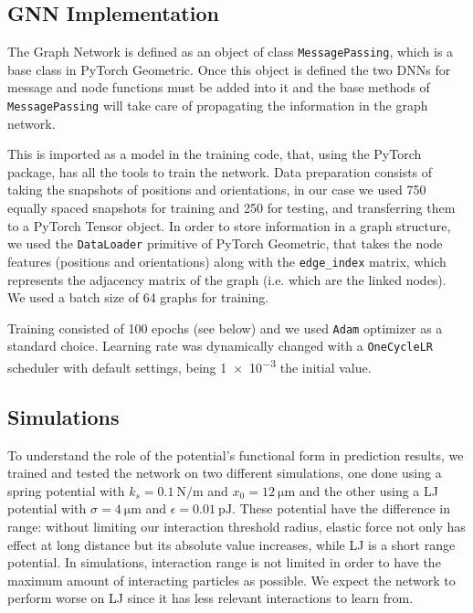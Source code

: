\documentclass[../../master_thesis_np.tex]{subfiles}
\begin{document}
\subsection{GNN Implementation}
The Graph Network is defined as an object of class \verb|MessagePassing|, which is a base class in PyTorch Geometric.
Once this object is defined the two DNNs for message and node functions must be added into it and the base methods of \verb|MessagePassing| will take care of propagating the information in the graph network.

This is imported as a model in the training code, that, using the PyTorch package, has all the tools to train the network.
Data preparation consists of taking the snapshots of positions and orientations, in our case we used 750 equally spaced snapshots for training and 250 for testing, and transferring them to a PyTorch Tensor object.
In order to store information in a graph structure, we used the \verb|DataLoader| primitive of PyTorch Geometric, that takes the node features (positions and orientations) along with the \verb|edge_index| matrix, which represents the adjacency matrix of the graph (i.e. which are the linked nodes).
We used a batch size of 64 graphs for training.

Training consisted of 100 epochs (see below) and we used \verb|Adam| optimizer as a standard choice.
Learning rate was dynamically changed with a \verb|OneCycleLR| scheduler with default settings, being \num{1e-3} the initial value.

\subsection{Simulations}
To understand the role of the potential's functional form in prediction results, we trained and tested the network on two different simulations, one done using a spring potential with $k_s = \SI{0.1}{\newton\per\meter}$ and $x_0 = \SI{12}{\um}$ and the other using a LJ potential with $\sigma = \SI{4}{\um}$ and $\epsilon = \SI{0.01}{\pico\joule}$.
These potential have the difference in range: without limiting our interaction threshold radius, elastic force not only has effect at long distance but its absolute value increases, while LJ is a short range potential.
In simulations, interaction range is not limited in order to have the maximum amount of interacting particles as possible.
We expect the network to perform worse on LJ since it has less relevant interactions to learn from.
\end{document}
